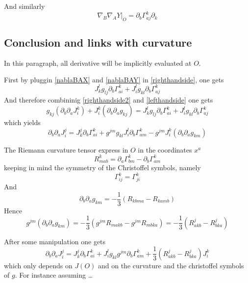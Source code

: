 \documentclass[11pt,makeidx]{amsart}%
\numberwithin{equation}{subsection}
\begin{document}
And similarly
\begin{equation}\label{nablaBAY}
\nabla_B \nabla_A Y \vert_O = \partial_b \Gamma^k_{aj} \partial_k
\end{equation}

\subsection{Conclusion and links with curvature}
In this paragraph, all derivative will be implicitly evaluated at $O$.

First by pluggin \eqref{nablaBAX} and \eqref{nablaBAY} in \eqref{righthandside}, one gets
\begin{equation}\label{righthandside2}
J^l_k g_{lj} \partial_b \Gamma^k_{ai} + J^l_i g_{kl}\partial_b \Gamma^k_{aj} 
\end{equation}
And therefore combininig \eqref{righthandside2} and \eqref{lefthandside} one gets
\begin{equation}
g_{kj} \left(\partial_b \partial_a J^k_i\right)
+ J^k_i \left(\partial_b \partial_a g_{kj}\right) = J^l_k g_{lj} \partial_b \Gamma^k_{ai} + J^l_i g_{kl}\partial_b \Gamma^k_{aj} 
\end{equation}
which yields
\begin{equation}\label{final}
\partial_b  \partial_a J_i^j = J^j_k \partial_b \Gamma^k_{ai} +g^{jm} g_{kl}J^l_i \partial_b \Gamma^k_{am} - g^{jm}J^k_i \left(\partial_b \partial_a g_{km}\right)
\end{equation}

The Riemann curvature tensor express in $O$ in the coordinates $x^a$
\begin{equation}
R^k_{mab} = \partial_a \Gamma^k_{bm} - \partial_b \Gamma^k_{am}
\end{equation}
keeping in mind the symmetry of the Christoffel symbols, namely
\begin{equation}
\Gamma^k_{ij} = \Gamma^k_{ji}
\end{equation}
And
\begin{equation}
\partial_b \partial_a g_{km} =  -\dfrac{1}{3}\left( 
R_{kbma} - R_{kamb}
\right)
\end{equation}
Hence
\begin{equation}
g^{jm} \left(\partial_b \partial_a g_{km}\right) = -\dfrac{1}{3}\left( 
g^{jm}R_{makb} - g^{jm}R_{mbka}
\right)
=-\dfrac{1}{3}\left( 
R^j_{akb} - R^j_{bka}
\right)
\end{equation}


After some manipulation one gets
\begin{equation}\label{final2}
\partial_b  \partial_a J_i^j = J^j_k \partial_b \Gamma^k_{ai} + J^l_ig_{kl}g^{jm} \partial_b \Gamma^k_{am} +\dfrac{1}{3}\left( 
R^j_{akb} - R^j_{bka}
\right)J^k_i
\end{equation}
which only depends on $J(O)$ and on the curvature and the christoffel symbols of $g$. For instance assuming 
…
\end{document}
